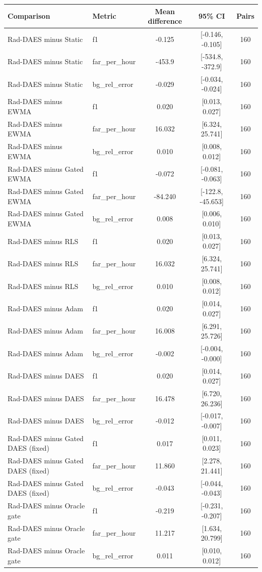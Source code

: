 \begin{tabular}{llccc}
\toprule
Comparison & Metric & Mean difference & 95\% CI & Pairs \\
\midrule
Rad-DAES minus Static & f1 & -0.125 & [-0.146, -0.105] & 160 \\
Rad-DAES minus Static & far\_per\_hour & -453.9 & [-534.8, -372.9] & 160 \\
Rad-DAES minus Static & bg\_rel\_error & -0.029 & [-0.034, -0.024] & 160 \\
Rad-DAES minus EWMA & f1 & 0.020 & [0.013, 0.027] & 160 \\
Rad-DAES minus EWMA & far\_per\_hour & 16.032 & [6.324, 25.741] & 160 \\
Rad-DAES minus EWMA & bg\_rel\_error & 0.010 & [0.008, 0.012] & 160 \\
Rad-DAES minus Gated EWMA & f1 & -0.072 & [-0.081, -0.063] & 160 \\
Rad-DAES minus Gated EWMA & far\_per\_hour & -84.240 & [-122.8, -45.653] & 160 \\
Rad-DAES minus Gated EWMA & bg\_rel\_error & 0.008 & [0.006, 0.010] & 160 \\
Rad-DAES minus RLS & f1 & 0.020 & [0.013, 0.027] & 160 \\
Rad-DAES minus RLS & far\_per\_hour & 16.032 & [6.324, 25.741] & 160 \\
Rad-DAES minus RLS & bg\_rel\_error & 0.010 & [0.008, 0.012] & 160 \\
Rad-DAES minus Adam & f1 & 0.020 & [0.014, 0.027] & 160 \\
Rad-DAES minus Adam & far\_per\_hour & 16.008 & [6.291, 25.726] & 160 \\
Rad-DAES minus Adam & bg\_rel\_error & -0.002 & [-0.004, -0.000] & 160 \\
Rad-DAES minus DAES & f1 & 0.020 & [0.014, 0.027] & 160 \\
Rad-DAES minus DAES & far\_per\_hour & 16.478 & [6.720, 26.236] & 160 \\
Rad-DAES minus DAES & bg\_rel\_error & -0.012 & [-0.017, -0.007] & 160 \\
Rad-DAES minus Gated DAES (fixed) & f1 & 0.017 & [0.011, 0.023] & 160 \\
Rad-DAES minus Gated DAES (fixed) & far\_per\_hour & 11.860 & [2.278, 21.441] & 160 \\
Rad-DAES minus Gated DAES (fixed) & bg\_rel\_error & -0.043 & [-0.044, -0.043] & 160 \\
Rad-DAES minus Oracle gate & f1 & -0.219 & [-0.231, -0.207] & 160 \\
Rad-DAES minus Oracle gate & far\_per\_hour & 11.217 & [1.634, 20.799] & 160 \\
Rad-DAES minus Oracle gate & bg\_rel\_error & 0.011 & [0.010, 0.012] & 160 \\
\bottomrule
\end{tabular}
